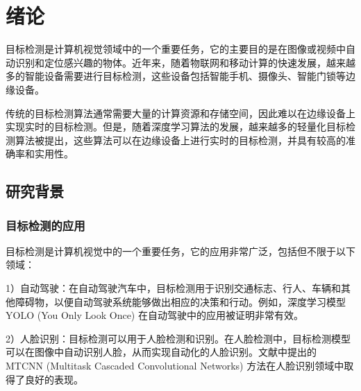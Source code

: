 \documentclass{ctexart}
\numberwithin{equation}{section}%
\numberwithin{figure}{section}%
\numberwithin{table}{section}%
\begin{document}
	\newpage
	\tableofcontents
	\newpage
	\setcounter{page}{1}
	\songti{}
	\section{绪论}
	目标检测是计算机视觉领域中的一个重要任务，它的主要目的是在图像或视频中自动识别和定位感兴趣的物体。近年来，随着物联网和移动计算的快速发展，越来越多的智能设备需要进行目标检测，这些设备包括智能手机、摄像头、智能门锁等边缘设备。
	
	
	传统的目标检测算法通常需要大量的计算资源和存储空间，因此难以在边缘设备上实现实时的目标检测。但是，随着深度学习算法的发展，越来越多的轻量化目标检测算法被提出，这些算法可以在边缘设备上进行实时的目标检测，并具有较高的准确率和实用性。
	
%	
%
	\subsection{研究背景}
	\subsubsection{目标检测的应用}
	目标检测是计算机视觉中的一个重要任务，它的应用非常广泛，包括但不限于以下领域：
	
	1）自动驾驶：在自动驾驶汽车中，目标检测用于识别交通标志、行人、车辆和其他障碍物，以便自动驾驶系统能够做出相应的决策和行动。例如，深度学习模型 YOLO (You Only Look Once) 在自动驾驶中的应用被证明非常有效\textsuperscript{\cite{1}}。
	
	2）人脸识别：目标检测可以用于人脸检测和识别。在人脸检测中，目标检测模型可以在图像中自动识别人脸，从而实现自动化的人脸识别。文献\textsuperscript{\cite{2}}中提出的 MTCNN (Multitask Cascaded Convolutional Networks) 方法在人脸识别领域中取得了良好的表现。
	
\end{document}

